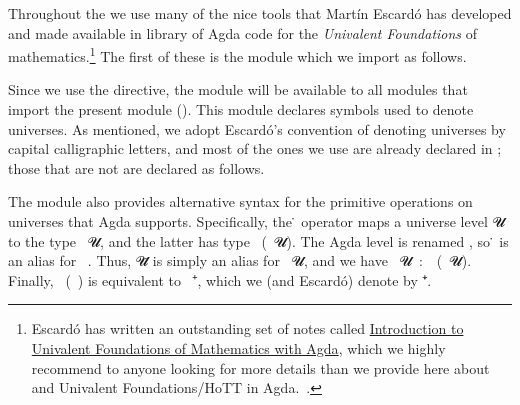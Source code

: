 Throughout the \agdaualib we use many of the nice tools that Martín Escardó has developed and made available in \typtop library of Agda code for the \emph{Univalent Foundations} of mathematics.\footnote{%
Escardó has written an outstanding set of notes called
\href{https://www.cs.bham.ac.uk/~mhe/HoTT-UF-in-Agda-Lecture-Notes/index.html}{Introduction to Univalent Foundations of Mathematics with Agda}, which we highly recommend to anyone looking for more details than we provide
here about \mltt and Univalent Foundations/HoTT in Agda.~\cite{MHE}.}
The first of these is the  module which we import as follows.
\ccpad
\begin{code}%
\>[0]\AgdaSpace{}%
\AgdaSpace{}%
\AgdaSpace{}%
\<%
\end{code}
\ccpad
Since we use the  directive, the  module will be available to all modules that import
the present module (). This module declares symbols used to denote universes. As mentioned, we adopt Escardó's convention of denoting universes by capital calligraphic letters, and most of the ones we use are already declared in ; those that are not are declared as follows.
\ccpad
\begin{code}%
\>[0]\AgdaSpace{}%
\AgdaSpace{}%
\AgdaSpace{}%
\AgdaSpace{}%
\AgdaSpace{}%
\AgdaSymbol{:}\AgdaSpace{}%
\<%
\end{code}
\scpad

The  module also provides alternative syntax for the primitive operations on universes that Agda supports. Specifically, the \af ̇ operator maps a universe level \ab 𝓤 to the type ~\ab 𝓤, and the latter has type ~(~\ab 𝓤). The Agda level  is renamed , so \af ̇ is an alias for ~. Thus, \ab 𝓤\af ̇ is simply an alias for ~\ab 𝓤, and we have ~\ab 𝓤~\as :~~(~\ab 𝓤). Finally, ~(~) is equivalent to ~\af ⁺, which we (and Escardó) denote by \af ⁺\af ̇.


